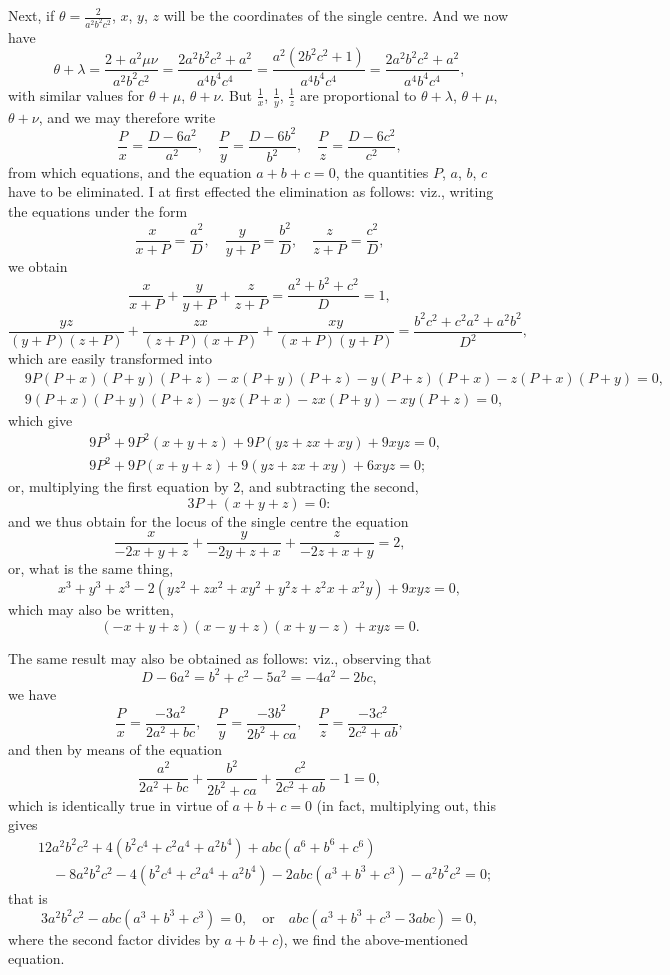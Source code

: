 \documentclass[11pt,a4paper]{article}
\theoremstyle{plain}
\begin{document}
\newpage
Next, if $\theta = \frac{2}{a^2b^2c^2}$, $x$, $y$, $z$ will be the coordinates of the single centre. And we now have
\[
\theta + \lambda = \frac{2 + a^2\mu\nu}{a^2b^2c^2} = \frac{2a^2b^2c^2 + a^2}{a^4b^4c^4} = \frac{a^2(2b^2c^2 + 1)}{a^4b^4c^4} = \frac{2a^2b^2c^2 + a^2}{a^4b^4c^4},
\]
with similar values for $\theta + \mu$, $\theta + \nu$. But $\frac{1}{x}$, $\frac{1}{y}$, $\frac{1}{z}$ are proportional to $\theta + \lambda$, $\theta + \mu$, $\theta + \nu$, and we may therefore write
\[
\frac{P}{x} = \frac{D - 6a^2}{a^2}, \quad \frac{P}{y} = \frac{D - 6b^2}{b^2}, \quad \frac{P}{z} = \frac{D - 6c^2}{c^2},
\]
from which equations, and the equation $a + b + c = 0$, the quantities $P$, $a$, $b$, $c$ have to be eliminated. I at first effected the elimination as follows: viz., writing the equations under the form
\[
\frac{x}{x + P} = \frac{a^2}{D}, \quad \frac{y}{y + P} = \frac{b^2}{D}, \quad \frac{z}{z + P} = \frac{c^2}{D},
\]
we obtain
\[
\frac{x}{x + P} + \frac{y}{y + P} + \frac{z}{z + P} = \frac{a^2 + b^2 + c^2}{D} = 1,
\]
\[
\frac{yz}{(y + P)(z + P)} + \frac{zx}{(z + P)(x + P)} + \frac{xy}{(x + P)(y + P)} = \frac{b^2c^2 + c^2a^2 + a^2b^2}{D^2},
\]
which are easily transformed into
\begin{align*}
&9P(P+x)(P+y)(P+z) - x(P+y)(P+z) - y(P+z)(P+x) - z(P+x)(P+y) = 0, \\
&9(P+x)(P+y)(P+z) - yz(P+x) - zx(P+y) - xy(P+z) = 0,
\end{align*}
which give
\begin{align*}
&9P^3 + 9P^2(x+y+z) + 9P(yz+zx+xy) + 9xyz = 0, \\
&9P^2 + 9P(x+y+z) + 9(yz+zx+xy) + 6xyz = 0;
\end{align*}
or, multiplying the first equation by 2, and subtracting the second,
\[
3P + (x + y + z) = 0:
\]
and we thus obtain for the locus of the single centre the equation
\[
\frac{x}{-2x + y + z} + \frac{y}{-2y + z + x} + \frac{z}{-2z + x + y} = 2,
\]
or, what is the same thing,
\[
x^3 + y^3 + z^3 - 2(yz^2 + zx^2 + xy^2 + y^2z + z^2x + x^2y) + 9xyz = 0,
\]
which may also be written,
\[
(-x + y + z)(x - y + z)(x + y - z) + xyz = 0.
\]

The same result may also be obtained as follows: viz., observing that
\[
D - 6a^2 = b^2 + c^2 - 5a^2 = -4a^2 - 2bc,
\]
we have
\[
\frac{P}{x} = \frac{-3a^2}{2a^2 + bc}, \quad \frac{P}{y} = \frac{-3b^2}{2b^2 + ca}, \quad \frac{P}{z} = \frac{-3c^2}{2c^2 + ab},
\]
and then by means of the equation
\[
\frac{a^2}{2a^2 + bc} + \frac{b^2}{2b^2 + ca} + \frac{c^2}{2c^2 + ab} - 1 = 0,
\]
which is identically true in virtue of $a + b + c = 0$ (in fact, multiplying out, this gives
\begin{align*}
&12a^2b^2c^2 + 4(b^2c^4 + c^2a^4 + a^2b^4) + abc(a^6 + b^6 + c^6) \\
&\quad - 8a^2b^2c^2 - 4(b^2c^4 + c^2a^4 + a^2b^4) - 2abc(a^3 + b^3 + c^3) - a^2b^2c^2 = 0;
\end{align*}
that is
\[
3a^2b^2c^2 - abc(a^3 + b^3 + c^3) = 0, \quad \text{or} \quad abc(a^3 + b^3 + c^3 - 3abc) = 0,
\]
where the second factor divides by $a + b + c$), we find the above-mentioned equation.
\end{document}
